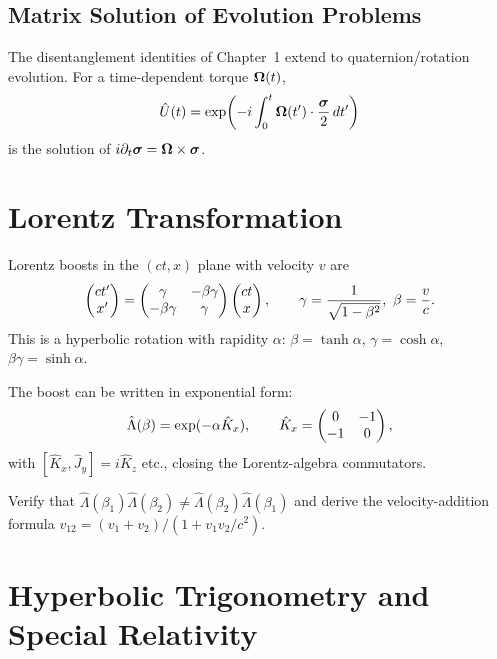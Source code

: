 \subsection{Matrix Solution of Evolution Problems}

The disentanglement identities of Chapter~1 extend to quaternion/rotation
evolution. For a time-dependent torque $\bm{\Omega}(t)$,
\begin{equation}
\hat U(t) = \exp\!\left(-i\int_0^t \bm{\Omega}(t')\cdot\frac{\bm{\sigma}}{2}\,dt'\right)
\label{eq:5.3.2}
\end{equation}
is the solution of $i\partial_t\bm{\sigma} = \bm{\Omega}\times\bm{\sigma}$.

\section{Lorentz Transformation}

Lorentz boosts in the $(ct,x)$ plane with velocity $v$ are
\begin{equation}
\begin{pmatrix} ct'\\x' \end{pmatrix}
=
\begin{pmatrix}\gamma&-\beta\gamma\\-\beta\gamma&\gamma\end{pmatrix}
\begin{pmatrix} ct\\x \end{pmatrix},
\qquad
\gamma=\frac{1}{\sqrt{1-\beta^2}},\ \beta=\frac{v}{c}.
\label{eq:5.4.1}
\end{equation}
This is a hyperbolic rotation with rapidity $\alpha$:
$\beta=\tanh\alpha$, $\gamma=\cosh\alpha$, $\beta\gamma=\sinh\alpha$.

The boost can be written in exponential form:
\begin{equation}
\hat\Lambda(\beta) = \exp(-\alpha\hat K_x), \qquad
\hat K_x = \begin{pmatrix}0&-1\\-1&0\end{pmatrix},
\label{eq:5.4.2}
\end{equation}
with $[\hat K_x,\hat J_y]=i\hat K_z$ etc., closing the Lorentz-algebra
commutators.

\begin{exercise}
Verify that $\hat\Lambda(\beta_1)\hat\Lambda(\beta_2)\neq\hat\Lambda(\beta_2)\hat\Lambda(\beta_1)$
and derive the velocity-addition formula
$v_{12}=(v_1+v_2)/(1+v_1v_2/c^2)$.
\end{exercise}

\section{Hyperbolic Trigonometry and Special Relativity}

